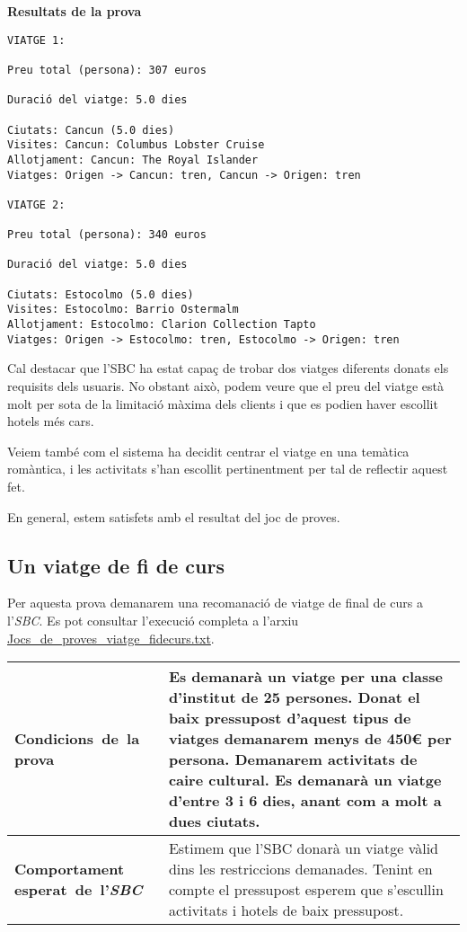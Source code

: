 \documentclass[11pt,a4paper]{article}
\begin{document}
\textbf{Resultats de la prova}\begin{lstlisting}
VIATGE 1:

Preu total (persona): 307 euros

Duració del viatge: 5.0 dies

Ciutats: Cancun (5.0 dies)
Visites: Cancun: Columbus Lobster Cruise
Allotjament: Cancun: The Royal Islander
Viatges: Origen -> Cancun: tren, Cancun -> Origen: tren

VIATGE 2:

Preu total (persona): 340 euros

Duració del viatge: 5.0 dies

Ciutats: Estocolmo (5.0 dies)
Visites: Estocolmo: Barrio Ostermalm
Allotjament: Estocolmo: Clarion Collection Tapto
Viatges: Origen -> Estocolmo: tren, Estocolmo -> Origen: tren

\end{lstlisting}
\medskip

Cal destacar que l'SBC ha estat capaç de trobar dos viatges diferents donats els requisits dels usuaris. No obstant això, podem veure que el preu del viatge està molt per sota de la limitació màxima dels clients i que es podien haver escollit hotels més cars.

Veiem també com el sistema ha decidit centrar el viatge en una temàtica romàntica, i les activitats s'han escollit pertinentment per tal de reflectir aquest fet.

En general, estem satisfets amb el resultat del joc de proves.


\subsection{Un viatge de fi de curs}
Per aquesta prova demanarem una recomanació de viatge de final de curs a l'\emph{SBC}. Es pot consultar l'execució completa a l'arxiu \url{Jocs_de_proves_viatge_fidecurs.txt}.\\

\noindent
\begin{tabular}{|p{}|p{}|}
\hline
\textbf{\mbox{Condicions de la} \mbox{prova}} & Es demanarà un viatge per una classe d'institut de 25 persones. Donat el baix pressupost d'aquest tipus de viatges demanarem menys de 450\euro{} per persona. Demanarem activitats de caire cultural. Es demanarà un viatge d'entre 3 i 6 dies, anant com a molt a dues ciutats.\\
\hline
\textbf{Comportament \mbox{esperat de l'\emph{SBC}}} & Estimem que l'SBC donarà un viatge vàlid dins les restriccions demanades. Tenint en compte el pressupost esperem que s'escullin activitats i hotels de baix pressupost. \\
\hline
\end{tabular}
\end{document}
